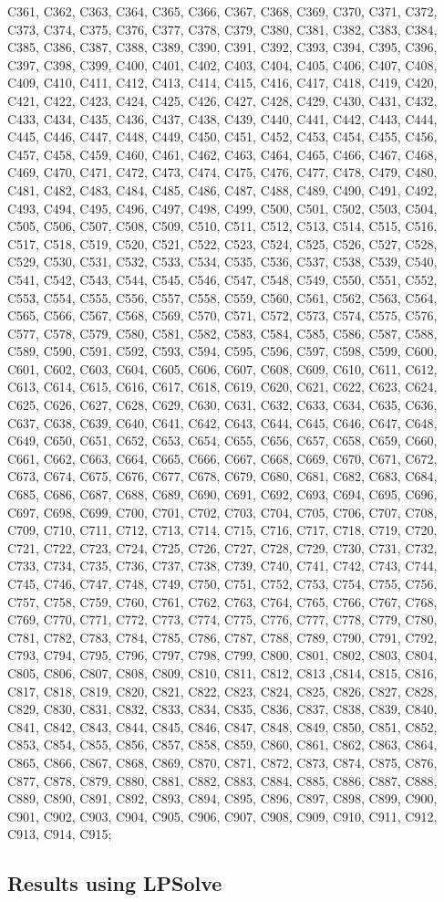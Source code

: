 C361, C362, C363, C364, C365, C366, C367, C368, C369, C370, C371, C372, C373, C374, C375, C376, C377, C378, C379, C380, C381, C382, C383, C384, C385, C386, C387, C388, C389, C390, C391, C392, C393, C394, C395, C396, C397, C398, C399, C400, C401, C402, C403, C404, C405, C406, C407, C408, C409, C410, C411, C412, C413, C414, C415, C416, C417, C418, C419, C420, C421, C422, C423, C424, C425, C426, C427, C428, C429, C430, C431, C432, C433, C434, C435, C436, C437, C438, C439, C440, C441, C442, C443, C444, C445, C446, C447, C448, C449, C450, C451, C452, C453, C454, C455, C456, C457, C458, C459, C460, C461, C462, C463, C464, C465, C466, C467, C468, C469, C470, C471, C472, C473, C474, C475, C476, C477, C478, C479, C480, C481, C482, C483, C484, C485, C486, C487, C488, C489, C490, C491, C492, C493, C494, C495, C496, C497, C498, C499, C500, C501, C502, C503, C504, C505, C506, C507, C508, C509, C510, C511, C512, C513, C514, C515, C516, C517, C518, C519, C520, C521, C522, C523, C524, C525, C526, C527, C528, C529, C530, C531, C532, C533, C534, C535, C536, C537, C538, C539, C540, C541, C542, C543, C544, C545, C546, C547, C548, C549, C550, C551, C552, C553, C554, C555, C556, C557, C558, C559, C560, C561, C562, C563, C564, C565, C566, C567, C568, C569, C570, C571, C572, C573, C574, C575, C576, C577, C578, C579, C580, C581, C582, C583, C584, C585, C586, C587, C588, C589, C590, C591, C592, C593, C594, C595, C596, C597, C598, C599, C600, C601, C602, C603, C604, C605, C606, C607, C608, C609, C610, C611, C612, C613, C614, C615, C616, C617, C618, C619, C620, C621, C622, C623, C624, C625, C626, C627, C628, C629, C630, C631, C632, C633, C634, C635, C636, C637, C638, C639, C640, C641, C642, C643, C644, C645, C646, C647, C648, C649, C650, C651, C652, C653, C654, C655, C656, C657, C658, C659, C660, C661, C662, C663, C664, C665, C666, C667, C668, C669, C670, C671, C672, C673, C674, C675, C676, C677, C678, C679, C680, C681, C682, C683, C684, C685, C686, C687, C688, C689, C690, C691, C692, C693, C694, C695, C696, C697, C698, C699, C700, C701, C702, C703, C704, C705, C706, C707, C708, C709, C710, C711, C712, C713, C714, C715, C716, C717, C718, C719, C720, C721, C722, C723, C724, C725, C726, C727, C728, C729, C730, C731, C732, C733, C734, C735, C736, C737, C738, C739, C740, C741, C742, C743, C744, C745, C746, C747, C748, C749, C750, C751, C752, C753, C754, C755, C756, C757, C758, C759, C760, C761, C762, C763, C764, C765, C766, C767, C768, C769, C770, C771, C772, C773, C774, C775, C776, C777, C778, C779, C780, C781, C782, C783, C784, C785, C786, C787, C788, C789, C790, C791, C792, C793, C794, C795, C796, C797, C798, C799, C800, C801, C802, C803, C804, C805, C806, C807, C808, C809, C810, C811, C812, C813 ,C814, C815, C816, C817, C818, C819, C820, C821, C822, C823, C824, C825, C826, C827, C828, C829, C830, C831, C832, C833, C834, C835, C836, C837, C838, C839, C840, C841, C842, C843, C844, C845, C846, C847, C848, C849, C850, C851, C852, C853, C854, C855, C856, C857, C858, C859, C860, C861, C862, C863, C864, C865, C866, C867, C868, C869, C870, C871, C872, C873, C874, C875, C876, C877, C878, C879, C880, C881, C882, C883, C884, C885, C886, C887, C888, C889, C890, C891, C892, C893, C894, C895, C896, C897, C898, C899, C900, C901, C902, C903, C904, C905, C906, C907, C908, C909, C910, C911, C912, C913, C914, C915; \\


\subsection{Results using LPSolve}

